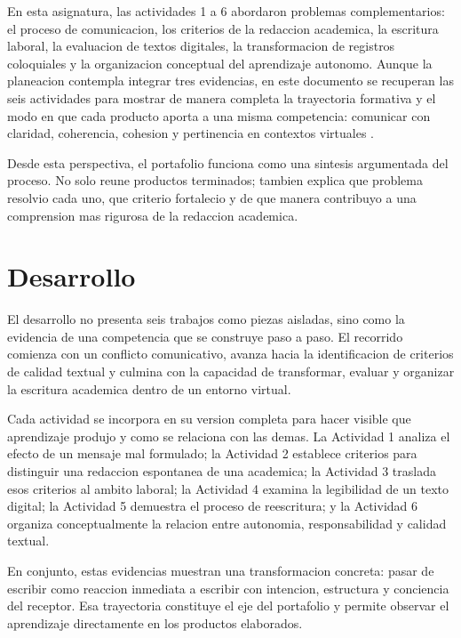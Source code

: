 \documentclass[
	spanish,
	letterpaper, oneside
]{article}
\begin{document}
En esta asignatura, las actividades 1 a 6 abordaron problemas complementarios: el proceso de comunicacion, los criterios de la redaccion academica, la escritura laboral, la evaluacion de textos digitales, la transformacion de registros coloquiales y la organizacion conceptual del aprendizaje autonomo. Aunque la planeacion contempla integrar tres evidencias, en este documento se recuperan las seis actividades para mostrar de manera completa la trayectoria formativa y el modo en que cada producto aporta a una misma competencia: comunicar con claridad, coherencia, cohesion y pertinencia en contextos virtuales \citep{correaManualBasicoEscritura2018,nunezcortesEscrituraAcademicaTeoria2015}.

Desde esta perspectiva, el portafolio funciona como una sintesis argumentada del proceso. No solo reune productos terminados; tambien explica que problema resolvio cada uno, que criterio fortalecio y de que manera contribuyo a una comprension mas rigurosa de la redaccion academica.

\section{Desarrollo}

El desarrollo no presenta seis trabajos como piezas aisladas, sino como la evidencia de una competencia que se construye paso a paso. El recorrido comienza con un conflicto comunicativo, avanza hacia la identificacion de criterios de calidad textual y culmina con la capacidad de transformar, evaluar y organizar la escritura academica dentro de un entorno virtual.

Cada actividad se incorpora en su version completa para hacer visible que aprendizaje produjo y como se relaciona con las demas. La Actividad 1 analiza el efecto de un mensaje mal formulado; la Actividad 2 establece criterios para distinguir una redaccion espontanea de una academica; la Actividad 3 traslada esos criterios al ambito laboral; la Actividad 4 examina la legibilidad de un texto digital; la Actividad 5 demuestra el proceso de reescritura; y la Actividad 6 organiza conceptualmente la relacion entre autonomia, responsabilidad y calidad textual.

En conjunto, estas evidencias muestran una transformacion concreta: pasar de escribir como reaccion inmediata a escribir con intencion, estructura y conciencia del receptor. Esa trayectoria constituye el eje del portafolio y permite observar el aprendizaje directamente en los productos elaborados.
\end{document}
